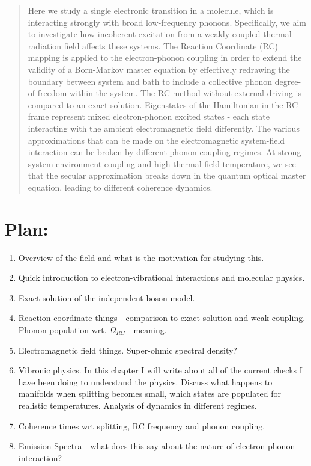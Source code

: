 \documentclass[]{article}
\begin{document}
\maketitle
\begin{abstract}
Here we study a single electronic transition in a molecule, which is interacting strongly with broad low-frequency phonons. Specifically, we aim to investigate how incoherent excitation from a weakly-coupled thermal radiation field affects these systems. The Reaction Coordinate (RC) mapping is applied to the electron-phonon coupling in order to extend the validity of a Born-Markov master equation by effectively redrawing the boundary between system and bath to include a collective phonon degree-of-freedom within the system. The RC method without external driving is compared to an exact solution. Eigenstates of the Hamiltonian in the RC frame represent mixed electron-phonon excited states - each state interacting with the ambient electromagnetic field differently. The various approximations that can be made on the electromagnetic system-field interaction can be broken by different phonon-coupling regimes. At strong system-environment coupling and high thermal field temperature, we see that the secular approximation breaks down in the quantum optical master equation, leading to different coherence dynamics.
\end{abstract}
 
\section{Plan:}
\begin{enumerate}
	\item Overview of the field and what is the motivation for studying this.
	\item Quick introduction to electron-vibrational interactions and molecular physics.
	\item Exact solution of the independent boson model.
	\item Reaction coordinate things - comparison to exact solution and weak coupling. Phonon population wrt. $\Omega_{RC}$ - meaning.
	\item Electromagnetic field things. Super-ohmic spectral density?
	\item Vibronic physics. In this chapter I will write about all of the current checks I have been doing to understand the physics. Discuss what happens to manifolds when splitting becomes small, which states are populated for realistic temperatures. Analysis of dynamics in different regimes.
	\item Coherence times wrt splitting, RC frequency and phonon coupling.
	\item Emission Spectra - what does this say about the nature of electron-phonon interaction?
\end{enumerate}
\end{document}

